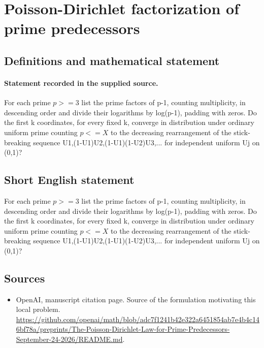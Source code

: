 \documentclass[11pt]{article}
\begin{document}
\section*{Poisson-Dirichlet factorization of prime predecessors}\label{statement}
\subsection{Definitions and mathematical statement}
\paragraph{Statement recorded in the supplied source.}
For each prime $p>=3$ list the prime factors of p-1, counting multiplicity, in descending order and divide their logarithms by log(p-1), padding with zeros. Do the first k coordinates, for every fixed k, converge in distribution under ordinary uniform prime counting $p<=X$ to the decreasing rearrangement of the stick-breaking sequence U1,(1-U1)U2,(1-U1)(1-U2)U3,... for independent uniform Uj on (0,1)?
\subsection{Short English statement}
For each prime $p>=3$ list the prime factors of p-1, counting multiplicity, in descending order and divide their logarithms by log(p-1), padding with zeros. Do the first k coordinates, for every fixed k, converge in distribution under ordinary uniform prime counting $p<=X$ to the decreasing rearrangement of the stick-breaking sequence U1,(1-U1)U2,(1-U1)(1-U2)U3,... for independent uniform Uj on (0,1)?
\subsection{Sources}
\begin{itemize}
\item[S1] OpenAI, manuscript citation page. Source of the formulation motivating this local problem.
\url{https://github.com/openai/math/blob/adc7f1241b42e322a6451854ab7e4b4c146bf78a/preprints/The-Poisson-Dirichlet-Law-for-Prime-Predecessors-September-24-2026/README.md}.
\end{itemize}
\end{document}
